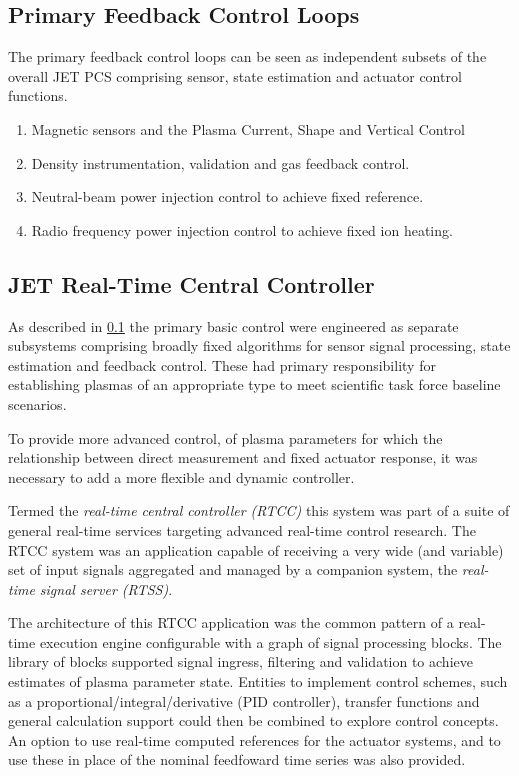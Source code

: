\documentclass[preprint,12pt]{elsarticle}
\begin{document}
\subsection{Primary Feedback Control Loops}

\label{s_primary_fb}

The primary feedback control loops can be seen as independent subsets of the overall JET PCS
comprising sensor, state estimation and actuator control functions.

\begin{enumerate}
	\item{Magnetic sensors and the Plasma Current, Shape and Vertical Control}
	\item{Density instrumentation, validation and gas feedback control.}
	\item{Neutral-beam power injection control to achieve fixed reference.}
	\item{Radio frequency power injection control to achieve fixed ion heating.}
\end{enumerate}

\subsection{JET Real-Time Central Controller}
\label{s_rtcc}

As described in \ref{s_primary_fb} the primary basic control were
engineered as separate subsystems comprising broadly fixed algorithms
for sensor signal processing, state estimation and feedback control.
These had primary responsibility for establishing plasmas of an
appropriate type to meet scientific task force baseline scenarios.

To provide more advanced control, of plasma parameters for which the
relationship between direct measurement and fixed actuator response, 
it was necessary to add a more flexible and dynamic controller.

Termed the {\em real-time central controller (RTCC)} this system was
part of a suite of general real-time services targeting advanced
real-time control research.  The RTCC system was an application 
capable of receiving a very wide (and variable) set of input signals
aggregated and managed by a companion system, the {\em real-time signal server (RTSS)}.

The architecture of this RTCC application was the common pattern of
a real-time execution engine configurable with a graph of signal
processing blocks.  The library of blocks supported signal ingress,
filtering and validation to achieve estimates of plasma parameter
state.  Entities to implement control schemes, such as a proportional/integral/derivative
(PID controller), transfer functions and general calculation support
could then be combined to explore control concepts.  An option to
use real-time computed references for the actuator systems, and to 
use these in place of the nominal feedfoward time series was also
provided.
\end{document}
